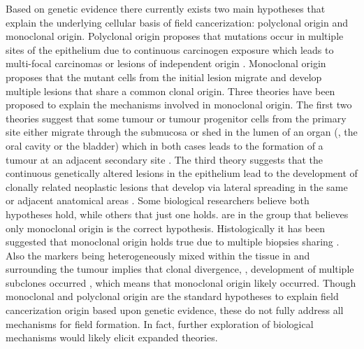 \documentclass[\main/thesis.tex]{subfiles}
\begin{document}
Based on genetic evidence there currently exists two main hypotheses that 
explain the underlying cellular basis of field cancerization: polyclonal origin 
and monoclonal origin. Polyclonal origin proposes that mutations occur in 
multiple sites of the epithelium due to continuous carcinogen exposure which 
leads to multi-focal carcinomas or lesions of independent origin 
\parencite{VanOijen}. Monoclonal origin proposes that the mutant cells from the 
initial lesion migrate and develop multiple lesions that share a common clonal 
origin. Three theories have been proposed to explain the mechanisms involved in 
monoclonal origin. The first two theories suggest that some tumour or tumour 
progenitor cells from the primary site either migrate through the submucosa or 
shed in the lumen of an organ (\eg, the oral cavity or the bladder) which in 
both cases leads to the formation of a tumour at an adjacent secondary site 
\parencite{Califano1999,Bedi}. The third theory suggests that the continuous 
genetically altered lesions in the epithelium lead to the development of 
clonally related neoplastic lesions that develop via lateral spreading in the 
same or adjacent anatomical areas \parencite{Angadi,Prevo,Tabor2002,Simon}. Some 
biological researchers believe both hypotheses hold, while others that just one 
holds. \textcite{Braakhuis} are in the group that believes only monoclonal 
origin is the correct hypothesis. Histologically it has been suggested that
monoclonal origin holds true due to multiple biopsies sharing  \parencite{VanHouten,Califano1999,Tabor122001}. 
Also the  markers being heterogeneously mixed within the 
tissue in and surrounding the tumour implies that clonal divergence, \ie, 
development of multiple subclones occurred \parencite{Nowell}, which means that 
monoclonal origin likely occurred. Though monoclonal and polyclonal 
origin are the standard hypotheses to explain field cancerization origin based 
upon genetic evidence, these do not fully address all mechanisms for field 
formation. In fact, further exploration of biological mechanisms would likely 
elicit expanded theories. 
\end{document}
